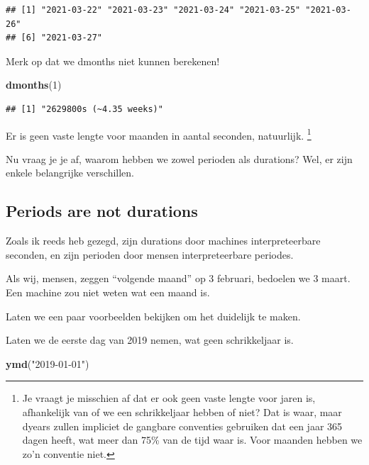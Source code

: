 \documentclass[]{tufte-book}
\newenvironment{Shaded}{}{}
\newcommand{\DecValTok}[1]{\textcolor[rgb]{0.25,0.63,0.44}{#1}}
\newcommand{\KeywordTok}[1]{\textcolor[rgb]{0.00,0.44,0.13}{\textbf{#1}}}
\newcommand{\NormalTok}[1]{#1}
\newcommand{\StringTok}[1]{\textcolor[rgb]{0.25,0.44,0.63}{#1}}
\begin{document}
\begin{verbatim}
## [1] "2021-03-22" "2021-03-23" "2021-03-24" "2021-03-25" "2021-03-26"
## [6] "2021-03-27"
\end{verbatim}

Merk op dat we dmonths niet kunnen berekenen!

\begin{Shaded}
\begin{Highlighting}[]
\KeywordTok{dmonths}\NormalTok{(}\DecValTok{1}\NormalTok{)}
\end{Highlighting}
\end{Shaded}

\begin{verbatim}
## [1] "2629800s (~4.35 weeks)"
\end{verbatim}

Er is geen vaste lengte voor maanden in aantal seconden, natuurlijk. \footnote{Je vraagt je misschien af dat er ook geen vaste lengte voor jaren is, afhankelijk van of we een schrikkeljaar hebben of niet? Dat is waar, maar dyears zullen impliciet de gangbare conventies gebruiken dat een jaar 365 dagen heeft, wat meer dan 75\% van de tijd waar is. Voor maanden hebben we zo'n conventie niet.}

Nu vraag je je af, waarom hebben we zowel perioden als durations? Wel, er zijn enkele belangrijke verschillen.

\hypertarget{periods-are-not-durations}{%
\subsection{Periods are not durations}\label{periods-are-not-durations}}

Zoals ik reeds heb gezegd, zijn durations door machines interpreteerbare seconden, en zijn perioden door mensen interpreteerbare periodes.

Als wij, mensen, zeggen ``volgende maand'' op 3 februari, bedoelen we 3 maart. Een machine zou niet weten wat een maand is.

Laten we een paar voorbeelden bekijken om het duidelijk te maken.

Laten we de eerste dag van 2019 nemen, wat geen schrikkeljaar is.

\begin{Shaded}
\begin{Highlighting}[]
\KeywordTok{ymd}\NormalTok{(}\StringTok{"2019-01-01"}\NormalTok{)}
\end{Highlighting}
\end{Shaded}
\end{document}
